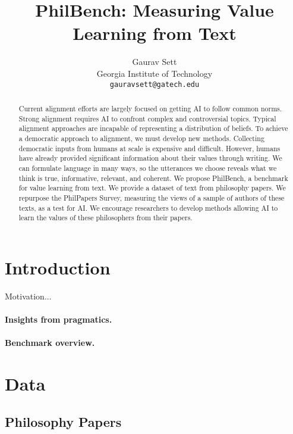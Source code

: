 \documentclass{article}
\title{PhilBench: Measuring Value Learning from Text}
\author{%
    Gaurav Sett \\ %
    Georgia Institute of Technology\\
    \texttt{gauravsett@gatech.edu} \\
}
\begin{document}
\maketitle


\begin{abstract}
    Current alignment efforts are largely focused on getting AI to follow common norms. 
    Strong alignment requires AI to confront complex and controversial topics. 
    Typical alignment approaches are incapable of representing a distribution of beliefs. 
    To achieve a democratic approach to alignment, we must develop new methods. 
    Collecting democratic inputs from humans at scale is expensive and difficult. 
    However, humans have already provided significant information about their values through writing. 
    We can formulate language in many ways, so the utterances we choose reveals what we think is true, informative, relevant, and coherent. 
    We propose PhilBench, a benchmark for value learning from text. We provide a dataset of text from philosophy papers. 
    We repurpose the PhilPapers Survey, measuring the views of a sample of authors of these texts, as a test for AI. 
    We encourage researchers to develop methods allowing AI to learn the values of these philosophers from their papers.
\end{abstract}


\section{Introduction}

Motivation...

\paragraph*{Insights from pragmatics.} \parencite{grice1975logic}

\paragraph*{Benchmark overview.}


\section{Data}

\subsection{Philosophy Papers}
\end{document}
